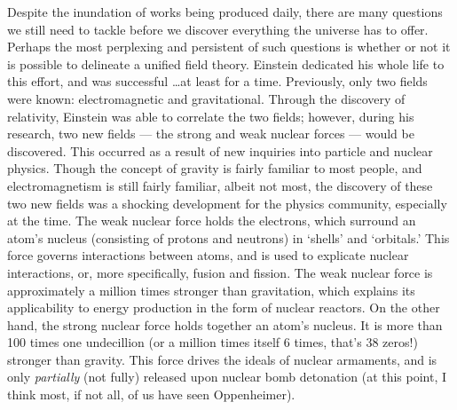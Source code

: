 \begin{justify}
  \hspace{.5in} Despite the inundation of works being produced daily, there are many questions we still need to tackle before we discover everything the universe has to offer. Perhaps the most perplexing and persistent of such questions is whether or not it is possible to delineate a unified field theory. Einstein dedicated his whole life to this effort, and was successful \ldots at least for a time. Previously, only two fields were known: electromagnetic and gravitational. Through the discovery of relativity, Einstein was able to correlate the two fields; however, during his research, two new fields — the strong and weak nuclear forces — would be discovered. This occurred as a result of new inquiries into particle and nuclear physics. Though the concept of gravity is fairly familiar to most people, and electromagnetism is still fairly familiar, albeit not most, the discovery of these two new fields was a shocking development for the physics community, especially at the time. The weak nuclear force holds the electrons, which surround an atom's nucleus (consisting of protons and neutrons) in `shells' and `orbitals.' This force governs interactions between atoms, and is used to explicate nuclear interactions, or, more specifically, fusion and fission. The weak nuclear force is approximately a million times stronger than gravitation, which explains its applicability to energy production in the form of nuclear reactors. On the other hand, the strong nuclear force holds together an atom's nucleus. It is more than 100 times one undecillion (or a million times itself 6 times, that's 38 zeros!) stronger than gravity. This force drives the ideals of nuclear armaments, and is only \textit{partially} (not fully) released upon nuclear bomb detonation (at this point, I think most, if not all, of us have seen Oppenheimer).


\end{justify}
